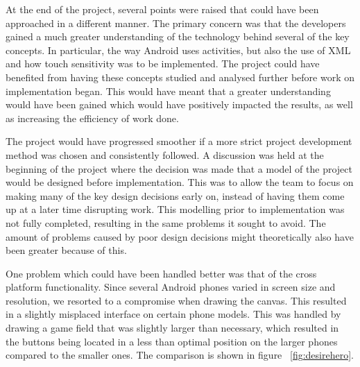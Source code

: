 At the end of the project, several points were raised that could have been approached in a different manner. The primary concern was that the developers gained a much greater understanding of the technology behind several of the key concepts. In particular, the way Android uses activities, but also the use of XML and how touch sensitivity was to be implemented. The project could have benefited from having these concepts studied and analysed further before work on implementation began. This would have meant that a greater understanding would have been gained which would have positively impacted the results, as well as increasing the efficiency of work done. 

The project would have progressed smoother if a more strict project development method was chosen and consistently followed. A discussion was held at the beginning of the project where the decision was made that a model of the project would be designed before implementation. This was to allow the team to focus on making many of the key design decisions early on, instead of having them come up at a later time disrupting work. This modelling prior to implementation was not fully completed, resulting in the same problems it sought to avoid. The amount of problems caused by poor design decisions might theoretically also have been greater because of this. 

One problem which could have been handled better was that of the cross platform functionality. Since several Android phones varied in screen size and resolution, we resorted to a compromise when drawing the canvas. This resulted in a slightly misplaced interface on certain phone models. This was handled by drawing a game field that was slightly larger than necessary, which resulted in the buttons being located in a less than optimal position on the larger phones compared to the smaller ones. The comparison is shown in figure ~\ref{fig:desirehero}.

